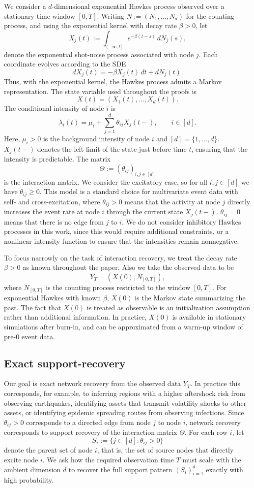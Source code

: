 \documentclass{article}
\begin{document}
We consider a $d$-dimensional exponential Hawkes process observed over a stationary time window $[0,T]$. Writing $N:=(N_1,\dots,N_d)$ for the counting process, and using the exponential kernel with decay rate $\beta>0$, let 
\[
X_j(t):=\int_{(-\infty,t]} e^{-\beta (t-s)}\, dN_j(s),
\]
denote the exponential shot-noise process associated with node $j$. Each coordinate evolves according to the SDE
\[
    dX_j(t)=-\beta X_j(t)\,dt+dN_j(t).
\]
Thus, with the exponential kernel, the Hawkes process admits a Markov representation. The state variable used throughout the proofs is \[ 
X(t)=(X_1(t),\dots,X_d(t)).
\] 
The conditional intensity of node $i$ is
\[
\lambda_i(t)=\mu_i+\sum_{j=1}^d \theta_{ij} X_j(t-), \qquad i\in[d].
\]
Here, $\mu_i>0$ is the background intensity of node $i$ and $[d]=\{1,\dots ,d\}$. $X_j(t-)$ denotes the left limit of the state just before time $t$, ensuring that the intensity is predictable. The matrix 
\[
\Theta := (\theta_{ij})_{i,j\in[d]}
\]
is the interaction matrix. We consider the excitatory case, so for all $i,j \in [d]$ we have $\theta_{ij}\geq0$. 
This model is a standard choice for multivariate event data with self- and cross-excitation, where $\theta_{ij}>0$ means that the activity at node $j$ directly increases the event rate at node $i$ through the current state $X_j(t-)$. $\theta_{ij}=0$ means that there is no edge from $j$ to $i$.
We do not consider inhibitory Hawkes processes in this work, since this would require additional constraints, or a nonlinear intensity function to ensure that the intensities remain nonnegative.

To focus narrowly on the task of interaction recovery, we treat the decay rate $\beta>0$ as known throughout the paper. Also we take the observed data to be 
\[ Y_T=(X(0),N_{[0,T]}), 
\] 
where $N_{[0,T]}$ is the counting process restricted to the window $[0,T]$. For exponential Hawkes with known $\beta$, \(X(0)\) is the Markov state summarizing the past. The fact that \(X(0)\) is treated as observable is an initialization assumption rather than additional information. In practice, \(X(0)\) is available in stationary simulations after burn-in, and can be approximated from a warm-up window of pre-\(0\) event data.

\subsection{Exact support-recovery}

Our goal is exact network recovery from the observed data $Y_T$. 
In practice this corresponds, for example, to inferring regions with a higher aftershock risk from observing earthquakes, identifying assets that transmit volatility shocks to other assets, or identifying epidemic spreading routes from observing infections. 
Since $\theta_{ij}>0$ corresponds to a directed edge from node $j$ to node $i$, network recovery corresponds to  support recovery of the interaction matrix $\Theta$.
For each row $i$, let
\[
S_i := \{j \in [d] : \theta_{ij} > 0\}
\]
denote the parent set of node $i$, that is, the set of source nodes that directly excite node $i$. We ask how the required observation time $T$ must scale with the ambient dimension $d$ to recover the full support pattern $(S_i)_{i=1}^d$ exactly with high probability. 
\end{document}
